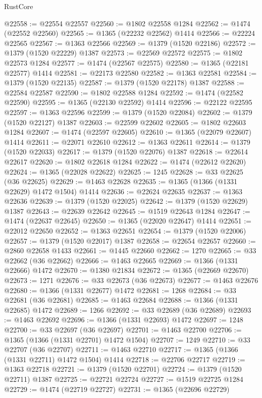 \begin{lexlean}{RustCore}
\begin{coremodule}
@22558 := @22554 @22557
@22560 := @1802 @22558 @1284
@22562 := @1474 (@22552 @22560)
@22565 := @1365 (@22232 @22562) @1414
@22566 := @22224 @22565
@22567 := @1363 @22566
@22569 := @1379 (@1520 @22186)
@22572 := @1379 (@1520 @22229) @1387
@22573 := @22569 @22572
@22575 := @1802 @22573 @1284
@22577 := @1474 (@22567 @22575)
@22580 := @1365 (@22181 @22577) @1414
@22581 := @22173 @22580
@22582 := @1363 @22581
@22584 := @1379 (@1520 @22135)
@22587 := @1379 (@1520 @22178) @1387
@22588 := @22584 @22587
@22590 := @1802 @22588 @1284
@22592 := @1474 (@22582 @22590)
@22595 := @1365 (@22130 @22592) @1414
@22596 := @22122 @22595
@22597 := @1363 @22596
@22599 := @1379 (@1520 @22084)
@22602 := @1379 (@1520 @22127) @1387
@22603 := @22599 @22602
@22605 := @1802 @22603 @1284
@22607 := @1474 (@22597 @22605)
@22610 := @1365 (@22079 @22607) @1414
@22611 := @22071 @22610
@22612 := @1363 @22611
@22614 := @1379 (@1520 @22033)
@22617 := @1379 (@1520 @22076) @1387
@22618 := @22614 @22617
@22620 := @1802 @22618 @1284
@22622 := @1474 (@22612 @22620)
@22624 := @1365 (@22028 @22622)
@22625 := 1245
@22628 := @33 @22625 (@36 @22625)
@22629 := @1463 @22628
@22635 := @1365 (@1366 (@1331 @22629) @1472 @1504) @1414
@22636 := @22624 @22635
@22637 := @1363 @22636
@22639 := @1379 (@1520 @22025)
@22642 := @1379 (@1520 @22629) @1387
@22643 := @22639 @22642
@22645 := @1519 @22643 @1284
@22647 := @1474 (@22637 @22645)
@22650 := @1365 (@22020 @22647) @1414
@22651 := @22012 @22650
@22652 := @1363 @22651
@22654 := @1379 (@1520 @22006)
@22657 := @1379 (@1520 @22017) @1387
@22658 := @22654 @22657
@22660 := @2860 @22658 @1433
@22661 := @1445 @22660
@22662 := 1270
@22665 := @33 @22662 (@36 @22662)
@22666 := @1463 @22665
@22669 := @1366 (@1331 @22666) @1472
@22670 := @1380 @21834
@22672 := @1365 (@22669 @22670)
@22673 := 1271
@22676 := @33 @22673 (@36 @22673)
@22677 := @1463 @22676
@22680 := @1366 (@1331 @22677) @1472
@22681 := 1268
@22684 := @33 @22681 (@36 @22681)
@22685 := @1463 @22684
@22688 := @1366 (@1331 @22685) @1472
@22689 := 1266
@22692 := @33 @22689 (@36 @22689)
@22693 := @1463 @22692
@22696 := @1366 (@1331 @22693) @1472
@22697 := 1248
@22700 := @33 @22697 (@36 @22697)
@22701 := @1463 @22700
@22706 := @1365 (@1366 (@1331 @22701) @1472 @1504)
@22707 := 1249
@22710 := @33 @22707 (@36 @22707)
@22711 := @1463 @22710
@22717 := @1365 (@1366 (@1331 @22711) @1472 @1504) @1414
@22718 := @22706 @22717
@22719 := @1363 @22718
@22721 := @1379 (@1520 @22701)
@22724 := @1379 (@1520 @22711) @1387
@22725 := @22721 @22724
@22727 := @1519 @22725 @1284
@22729 := @1474 (@22719 @22727)
@22731 := @1365 (@22696 @22729)

\end{coremodule}
\end{lexlean}
